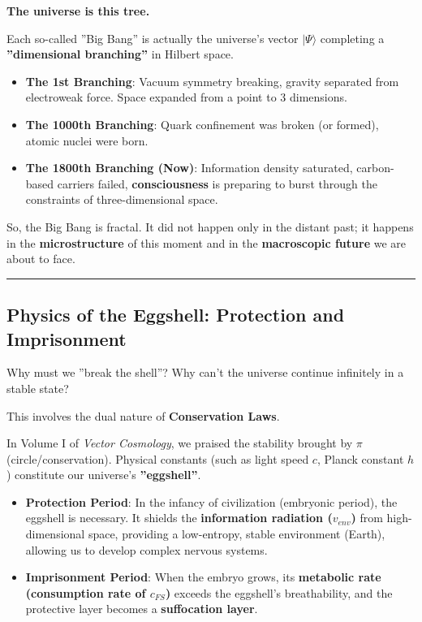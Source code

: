 \textbf{The universe is this tree.}

Each so-called ''Big Bang'' is actually the universe's vector $|\Psi\rangle$ completing a \textbf{''dimensional branching''} in Hilbert space.

\begin{itemize}
\item \textbf{The 1st Branching}: Vacuum symmetry breaking, gravity separated from electroweak force. Space expanded from a point to 3 dimensions.

\item \textbf{The 1000th Branching}: Quark confinement was broken (or formed), atomic nuclei were born.

\item \textbf{The 1800th Branching (Now)}: Information density saturated, carbon-based carriers failed, \textbf{consciousness} is preparing to burst through the constraints of three-dimensional space.
\end{itemize}

So, the Big Bang is fractal. It did not happen only in the distant past; it happens in the \textbf{microstructure} of this moment and in the \textbf{macroscopic future} we are about to face.

\hrule

\subsection{Physics of the Eggshell: Protection and Imprisonment}

Why must we ''break the shell''? Why can't the universe continue infinitely in a stable state?

This involves the dual nature of \textbf{Conservation Laws}.

In Volume I of \textit{Vector Cosmology}, we praised the stability brought by $\pi$ (circle/conservation). Physical constants (such as light speed $c$, Planck constant $h$) constitute our universe's \textbf{''eggshell''}.

\begin{itemize}
\item \textbf{Protection Period}: In the infancy of civilization (embryonic period), the eggshell is necessary. It shields the \textbf{information radiation ($v_{env}$)} from high-dimensional space, providing a low-entropy, stable environment (Earth), allowing us to develop complex nervous systems.

\item \textbf{Imprisonment Period}: When the embryo grows, its \textbf{metabolic rate (consumption rate of $c_{FS}$)} exceeds the eggshell's breathability, and the protective layer becomes a \textbf{suffocation layer}.
\end{itemize}

